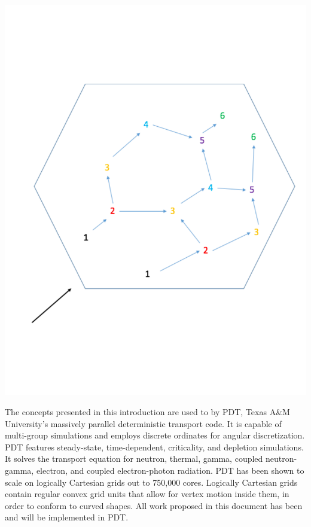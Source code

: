 \documentclass[11pt, letterpaper,titlepage,oneside]{article}
\begin{document}
\noindent\begin{minipage}{\textwidth}
\centering
\includegraphics[scale = 0.5]{tdg.pdf}
\label{tdg}
\end{minipage}
\smallskip

The concepts presented in this introduction are used to by PDT, Texas A\&M University's massively parallel deterministic transport code. It is capable of multi-group simulations and employs discrete ordinates for angular discretization. PDT features steady-state, time-dependent, criticality, and depletion simulations. It solves the transport equation for neutron, thermal, gamma, coupled neutron-gamma, electron, and coupled electron-photon radiation. PDT  has been shown to scale on logically Cartesian grids out to 750,000 cores. Logically Cartesian grids contain regular convex grid units that allow for vertex motion inside them, in order to conform to curved shapes. All work proposed in this document has been and will be implemented in PDT. 
\end{document}
